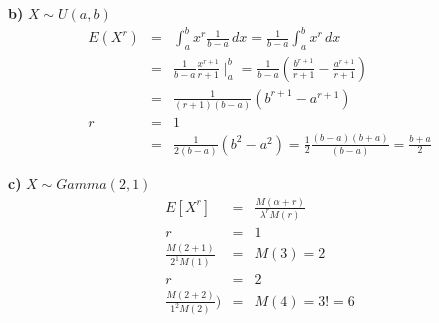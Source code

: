 \begin{enumerate}
\textbf{b)} $X \sim  U \left(a,b\right)$
\begin{eqnarray*} 
E\left(X^r\right)&=& \int_{a}^{b} x^{r} \frac{1}{b-a}\, dx = \frac{1}{b-a} \int_{a}^{b} x^{r} \, dx\\
&=& \frac{1}{b-a} \frac{x^{r+1}}{r+1}\mid_{a}^{b}= \frac{1}{b-a}\left( \frac{b^{r+1}}{r+1}- \frac{a^{r+1}}{r+1} \right)\\
&=&\frac{1}{\left(r+1\right)\left(b-a\right)}\left(b^{r+1}- a^{r+1}\right)\\
r&=& 1\\
&=&\frac{1}{2\left(b-a\right)}\left(b^2 - a^2 \right)= \frac{1}{2} \frac{\left(b-a\right)\left(b+a\right)}{\left(b-a\right)}= \frac{b+a}{2}
\end{eqnarray*}

\textbf{c)} $X \sim Gamma \left(2,1 \right)$
\begin{eqnarray*} 
E \left[X^r \right]&=& \frac{M \left(\alpha + r\right)}{\lambda^{r}M\left(r \right)}\\
r&=& 1\\
\frac{M \left(2+1\right)}{2^1 M \left(1\right)}&=& M\left(3\right)= 2\\
r&=&2\\
\frac{M\left(2+2\right)}{1^2 M \left(2\right)})&=& M\left(4 \right)= 3! = 6
\end{eqnarray*}



\end{enumerate}
